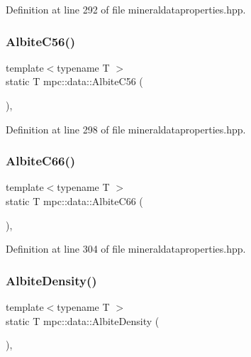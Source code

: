 Definition at line 292 of file mineraldataproperties.\+hpp.

\mbox{\label{namespacempc_1_1data_aa82672ed487ef6ead61b471a7988de05}} 
\subsubsection{\texorpdfstring{Albite\+C56()}{AlbiteC56()}}
{\footnotesize\ttfamily template$<$typename T $>$ \\
static T mpc\+::data\+::\+Albite\+C56 (\begin{DoxyParamCaption}{ }\end{DoxyParamCaption})\hspace{0.3cm}{\ttfamily [inline]}, {\ttfamily [static]}}



Definition at line 298 of file mineraldataproperties.\+hpp.

\mbox{\label{namespacempc_1_1data_a54c4461c6a3bc9d625f49bf1d03fe78d}} 
\subsubsection{\texorpdfstring{Albite\+C66()}{AlbiteC66()}}
{\footnotesize\ttfamily template$<$typename T $>$ \\
static T mpc\+::data\+::\+Albite\+C66 (\begin{DoxyParamCaption}{ }\end{DoxyParamCaption})\hspace{0.3cm}{\ttfamily [inline]}, {\ttfamily [static]}}



Definition at line 304 of file mineraldataproperties.\+hpp.

\mbox{\label{namespacempc_1_1data_aa88e3a21f0fb3001b8d14c1c65844fe0}} 
\subsubsection{\texorpdfstring{Albite\+Density()}{AlbiteDensity()}}
{\footnotesize\ttfamily template$<$typename T $>$ \\
static T mpc\+::data\+::\+Albite\+Density (\begin{DoxyParamCaption}{ }\end{DoxyParamCaption})\hspace{0.3cm}{\ttfamily [inline]}, {\ttfamily [static]}}



